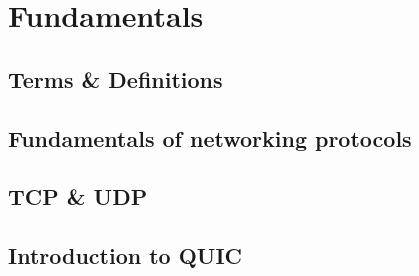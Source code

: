 \chapter{Fundamentals}

\section{Terms \& Definitions}

\section{Fundamentals of networking protocols}

\section{TCP \& UDP}

\section{Introduction to QUIC}